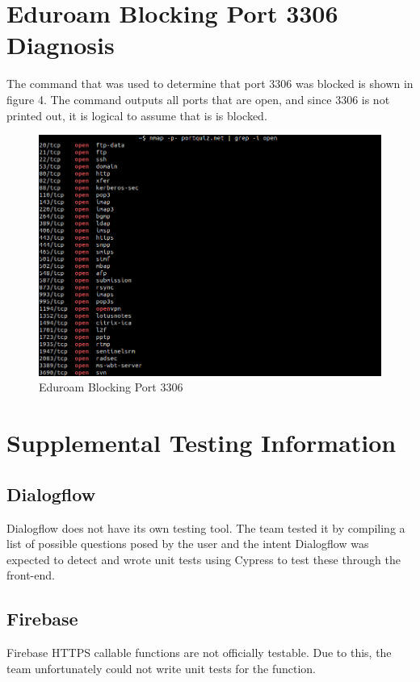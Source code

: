 \documentclass{l3proj}
\begin{document}
\section{Eduroam Blocking Port 3306 Diagnosis}
The command that was used to determine that port 3306 was blocked is shown in figure 4. The command outputs all ports that are open, and since 3306 is not printed out, it is logical to assume that is is blocked.

\begin{figure}[H]
    \centering
    \includegraphics[scale=0.5]{images/eduroam_blocking_3306}
    \caption{Eduroam Blocking Port 3306}
    \label{fig:eduroam}
\end{figure}

\section{Supplemental Testing Information}
\subsection{Dialogflow}
Dialogflow does not have its own testing tool. The team tested it by compiling a list of possible questions posed by the user and the intent Dialogflow was expected to detect and wrote unit tests using Cypress to test these through the front-end.

\subsection{Firebase}
Firebase HTTPS callable functions are not officially testable. Due to this, the team unfortunately could not write unit tests for the function.
\end{document}
